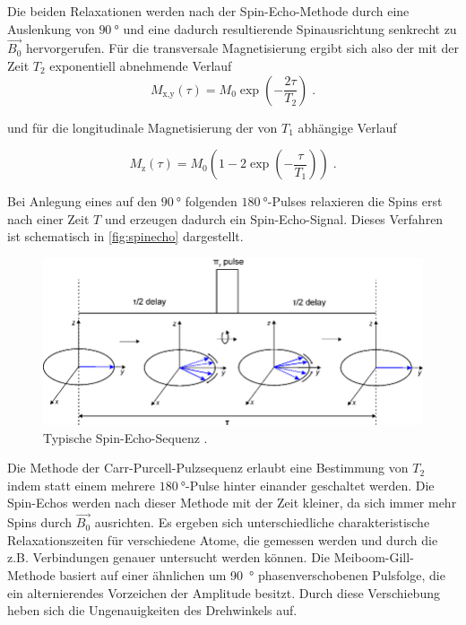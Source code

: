 Die beiden Relaxationen werden nach der Spin-Echo-Methode durch eine Auslenkung von $\SI{90}{\degree}$
und eine dadurch resultierende Spinausrichtung senkrecht zu $\vec{B_0}$ hervorgerufen.
Für die transversale Magnetisierung ergibt sich also der mit der Zeit $T_2$ exponentiell abnehmende Verlauf
\begin{equation}
    M_\text{x,y} \left(\tau\right) = M_0 \exp{\left(-\frac{2\tau}{T_2}\right)} \; .
    \label{eqn:MGM}
\end{equation}

und für die longitudinale Magnetisierung der von $T_1$ abhängige Verlauf 

\begin{equation}
    M_\text{z}\left(\tau\right) = M_0 \left(1-2\exp{\left(-\frac{\tau}{T_1}\right)}\right) \; .
    \label{eqn:SGR}
\end{equation}

Bei Anlegung eines auf den $\SI{90}{\degree}$ folgenden $\SI{180}{\degree}$-Pulses relaxieren die Spins erst nach einer Zeit $T$
und erzeugen dadurch ein Spin-Echo-Signal. Dieses Verfahren ist schematisch in \ref{fig:spinecho} dargestellt.

\begin{figure}
    \centering
    \includegraphics[scale=0.4]{content/spinecho.png}
    \caption{Typische Spin-Echo-Sequenz \cite{spinecho}.}
    \label{fig:mgm}
  \end{figure}

  Die Methode der Carr-Purcell-Pulzsequenz erlaubt eine Bestimmung von $T_2$ indem statt einem mehrere
  $\SI{180}{\degree}$-Pulse hinter einander geschaltet werden. Die Spin-Echos werden nach dieser
  Methode mit der Zeit kleiner, da sich immer mehr Spins durch $\vec{B_0}$ ausrichten.
  Es ergeben sich unterschiedliche charakteristische Relaxationszeiten für verschiedene Atome, 
  die gemessen werden und durch die z.B. Verbindungen genauer untersucht werden können.
  Die Meiboom-Gill-Methode basiert auf einer ähnlichen um \SI{90}{\degree} phasenverschobenen Pulsfolge, 
  die ein alternierendes Vorzeichen der Amplitude besitzt. Durch diese Verschiebung heben sich die 
  Ungenauigkeiten des Drehwinkels auf.

